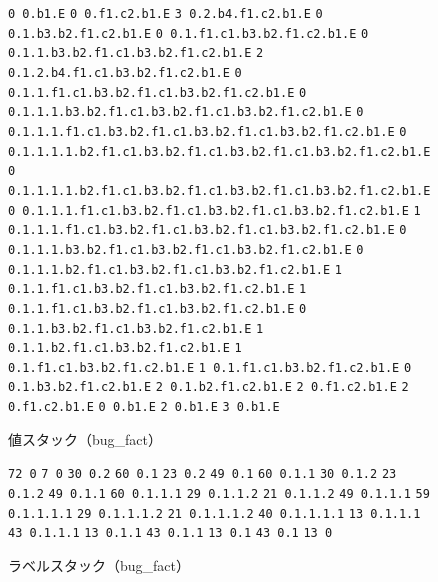 \documentclass[submit,PRO]{ipsj}
\def\|{\verb|}
\begin{document}
\begin{figure}[tb]
\vbox{
\hbox{\|0 0.b1.E|}
\hbox{\|0 0.f1.c2.b1.E|}
\hbox{\|3 0.2.b4.f1.c2.b1.E|}
\hbox{\|0 0.1.b3.b2.f1.c2.b1.E|}
\hbox{\|0 0.1.f1.c1.b3.b2.f1.c2.b1.E|}
\hbox{\|0 0.1.1.b3.b2.f1.c1.b3.b2.f1.c2.b1.E|}
\hbox{\|2 0.1.2.b4.f1.c1.b3.b2.f1.c2.b1.E|}
\hbox{\|0 0.1.1.f1.c1.b3.b2.f1.c1.b3.b2.f1.c2.b1.E|}
\hbox{\|0 0.1.1.1.b3.b2.f1.c1.b3.b2.f1.c1.b3.b2.f1.c2.b1.E|}
\hbox{\|0 0.1.1.1.f1.c1.b3.b2.f1.c1.b3.b2.f1.c1.b3.b2.f1.c2.b1.E|}
\hbox{\|0 0.1.1.1.1.b2.f1.c1.b3.b2.f1.c1.b3.b2.f1.c1.b3.b2.f1.c2.b1.E|}
\hbox{\|0 0.1.1.1.1.b2.f1.c1.b3.b2.f1.c1.b3.b2.f1.c1.b3.b2.f1.c2.b1.E|}
\hbox{\|0 0.1.1.1.f1.c1.b3.b2.f1.c1.b3.b2.f1.c1.b3.b2.f1.c2.b1.E|}
\hbox{\|1 0.1.1.1.f1.c1.b3.b2.f1.c1.b3.b2.f1.c1.b3.b2.f1.c2.b1.E|}
\hbox{\|0 0.1.1.1.b3.b2.f1.c1.b3.b2.f1.c1.b3.b2.f1.c2.b1.E|}
\hbox{\|0 0.1.1.1.b2.f1.c1.b3.b2.f1.c1.b3.b2.f1.c2.b1.E|}
\hbox{\|1 0.1.1.f1.c1.b3.b2.f1.c1.b3.b2.f1.c2.b1.E|}
\hbox{\|1 0.1.1.f1.c1.b3.b2.f1.c1.b3.b2.f1.c2.b1.E|}
\hbox{\|0 0.1.1.b3.b2.f1.c1.b3.b2.f1.c2.b1.E|}
\hbox{\|1 0.1.1.b2.f1.c1.b3.b2.f1.c2.b1.E|}
\hbox{\|1 0.1.f1.c1.b3.b2.f1.c2.b1.E|}
\hbox{\|1 0.1.f1.c1.b3.b2.f1.c2.b1.E|}
\hbox{\|0 0.1.b3.b2.f1.c2.b1.E|}
\hbox{\|2 0.1.b2.f1.c2.b1.E|}
\hbox{\|2 0.f1.c2.b1.E|}
\hbox{\|2 0.f1.c2.b1.E|}
\hbox{\|0 0.b1.E|}
\hbox{\|2 0.b1.E|}
\hbox{\|3 0.b1.E|}
}
\centerline{}
\caption{値スタック（bug\_fact）}
\label{fig:value}
\end{figure}

\begin{figure}[tb]
\vbox{
\hbox{\|72 0|}
\hbox{\|7 0|}
\hbox{\|30 0.2|}
\hbox{\|60 0.1|}
\hbox{\|23 0.2|}
\hbox{\|49 0.1|}
\hbox{\|60 0.1.1|}
\hbox{\|30 0.1.2|}
\hbox{\|23 0.1.2|}
\hbox{\|49 0.1.1|}
\hbox{\|60 0.1.1.1|}
\hbox{\|29 0.1.1.2|}
\hbox{\|21 0.1.1.2|}
\hbox{\|49 0.1.1.1|}
\hbox{\|59 0.1.1.1.1|}
\hbox{\|29 0.1.1.1.2|}
\hbox{\|21 0.1.1.1.2|}
\hbox{\|40 0.1.1.1.1|}
\hbox{\|13 0.1.1.1|}
\hbox{\|43 0.1.1.1|}
\hbox{\|13 0.1.1|}
\hbox{\|43 0.1.1|}
\hbox{\|13 0.1|}
\hbox{\|43 0.1|}
\hbox{\|13 0|}
}
\centerline{}
\caption{ラベルスタック（bug\_fact）}
\label{fig:label}
\end{figure}
\end{document}
